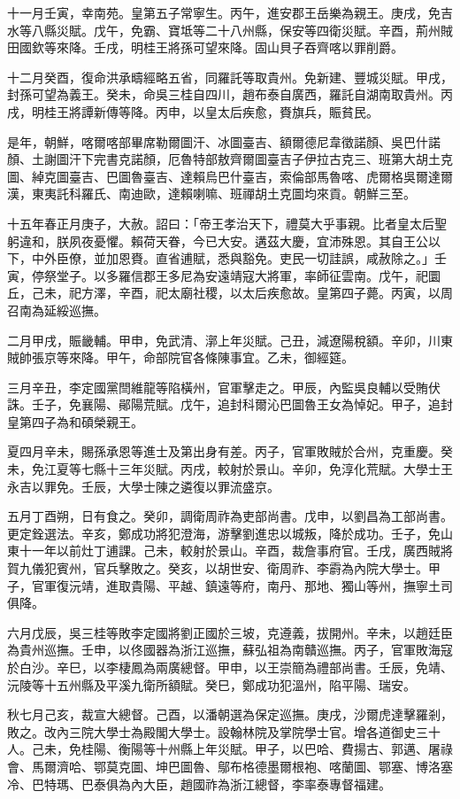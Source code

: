 \begin{pinyinscope}
十一月壬寅，幸南苑。皇第五子常寧生。丙午，進安郡王岳樂為親王。庚戌，免吉水等八縣災賦。戊午，免霸、寶坻等二十八州縣，保安等四衛災賦。辛酉，荊州賊田國欽等來降。壬戌，明桂王將孫可望來降。固山貝子吞齊喀以罪削爵。

十二月癸酉，復命洪承疇經略五省，同羅託等取貴州。免新建、豐城災賦。甲戌，封孫可望為義王。癸未，命吳三桂自四川，趙布泰自廣西，羅託自湖南取貴州。丙戌，明桂王將譚新傳等降。丙申，以皇太后疾愈，賚旗兵，賑貧民。

是年，朝鮮，喀爾喀部畢席勒爾圖汗、冰圖臺吉、額爾德尼韋徵諾顏、吳巴什諾顏、土謝圖汗下完書克諾顏，厄魯特部敖齊爾圖臺吉子伊拉古克三、班第大胡土克圖、綽克圖臺吉、巴圖魯臺吉、達賴烏巴什臺吉，索倫部馬魯喀、虎爾格吳爾達爾漢，東夷託科羅氏、南迪歐，達賴喇嘛、班禪胡土克圖均來貢。朝鮮三至。

十五年春正月庚子，大赦。詔曰：「帝王孝治天下，禮莫大乎事親。比者皇太后聖躬違和，朕夙夜憂懼。賴荷天眷，今已大安。遘茲大慶，宜沛殊恩。其自王公以下，中外臣僚，並加恩賚。直省逋賦，悉與豁免。吏民一切詿誤，咸赦除之。」壬寅，停祭堂子。以多羅信郡王多尼為安遠靖寇大將軍，率師征雲南。戊午，祀圜丘，己未，祀方澤，辛酉，祀太廟社稷，以太后疾愈故。皇第四子薨。丙寅，以周召南為延綏巡撫。

二月甲戌，賑畿輔。甲申，免武清、漷上年災賦。己丑，減遼陽稅額。辛卯，川東賊帥張京等來降。甲午，命部院官各條陳事宜。乙未，御經筵。

三月辛丑，李定國黨閆維龍等陷橫州，官軍擊走之。甲辰，內監吳良輔以受賄伏誅。壬子，免襄陽、鄖陽荒賦。戊午，追封科爾沁巴圖魯王女為悼妃。甲子，追封皇第四子為和碩榮親王。

夏四月辛未，賜孫承恩等進士及第出身有差。丙子，官軍敗賊於合州，克重慶。癸未，免江夏等七縣十三年災賦。丙戌，較射於景山。辛卯，免淳化荒賦。大學士王永吉以罪免。壬辰，大學士陳之遴復以罪流盛京。

五月丁酉朔，日有食之。癸卯，調衛周祚為吏部尚書。戊申，以劉昌為工部尚書。更定銓選法。辛亥，鄭成功將犯澄海，游擊劉進忠以城叛，降於成功。壬子，免山東十一年以前灶丁逋課。己未，較射於景山。辛酉，裁詹事府官。壬戌，廣西賊將賀九儀犯賓州，官兵擊敗之。癸亥，以胡世安、衛周祚、李霨為內院大學士。甲子，官軍復沅靖，進取貴陽、平越、鎮遠等府，南丹、那地、獨山等州，撫寧土司俱降。

六月戊辰，吳三桂等敗李定國將劉正國於三坡，克遵義，拔開州。辛未，以趙廷臣為貴州巡撫。壬申，以佟國器為浙江巡撫，蘇弘祖為南贛巡撫。丙子，官軍敗海寇於白沙。辛巳，以李棲鳳為兩廣總督。甲申，以王崇簡為禮部尚書。壬辰，免靖、沅陵等十五州縣及平溪九衛所額賦。癸巳，鄭成功犯溫州，陷平陽、瑞安。

秋七月己亥，裁宣大總督。己酉，以潘朝選為保定巡撫。庚戌，沙爾虎達擊羅剎，敗之。改內三院大學士為殿閣大學士。設翰林院及掌院學士官。增各道御史三十人。己未，免桂陽、衡陽等十州縣上年災賦。甲子，以巴哈、費揚古、郭邁、屠祿會、馬爾濟哈、鄂莫克圖、坤巴圖魯、鄔布格德墨爾根袍、喀蘭圖、鄂塞、博洛塞冷、巴特瑪、巴泰俱為內大臣，趙國祚為浙江總督，李率泰專督福建。


\end{pinyinscope}
